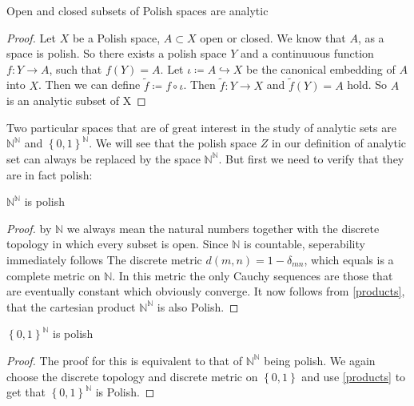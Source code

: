 \documentclass[10pt, a4paper, titlepage]{article}
\numberwithin{equation}{section}
\begin{document}
\begin{theorem}
	Open and closed subsets of Polish spaces are analytic
\end{theorem}

\begin{proof}
	Let $X$ be a Polish space, $A \subset X$ open or closed.
	We know that $A$, as a space is polish. So there exists a polish space $Y$ and a continuuous function  $f:Y\to A$, such that  $f(Y) = A$. 
	Let $\iota  \coloneq A \hookrightarrow X$ be the canonical embedding of  $A$ into  $X$. 
	Then we can define  $\tilde{f}  \coloneq f \circ \iota$. Then  $\tilde{f}:Y \to X $ and  $\tilde{f}(Y) = A$ hold. So  $A$ is an analytic subset of X


\end{proof}

Two particular spaces that are of great interest in the study of analytic sets are $\mathbb{N}^{\mathbb{N}}$ and $\left\{ 0,1 \right\}^{\mathbb{N}} $.
We will see that the polish space $Z$ in our definition of analytic set can always be replaced by the space $\mathbb{N}^{\mathbb{N}}$. But first we need to verify that they are in fact polish:

\begin{theorem}
	$\mathbb{N}^\mathbb{N}$ is polish
\end{theorem}
\begin{proof}
	by $\mathbb{N}$ we always mean the natural numbers together with the discrete topology in which every subset is open. Since $\mathbb{N}$ is countable, seperability immediately follows
	The discrete metric $d\left( m,n \right) = 1 - \delta_{mn} $, which equals is a complete metric on  $\mathbb{N}$.
	In this metric the only Cauchy sequences are those that are eventually constant which obviously converge.
	It now follows from \ref{products}, that the cartesian product $\mathbb{N}^{\mathbb{N}}$ is also Polish.
\end{proof}

\begin{theorem}
	$\left\{ 0,1 \right\}^\mathbb{N}$ is polish
\end{theorem}
\begin{proof}
	The proof for this is equivalent to that of $\mathbb{N}^{\mathbb{N}}$ being polish. We again choose the discrete topology and discrete metric on $\left\{ 0,1 \right\} $ and use \ref{products} to get that $\left\{ 0,1 \right\} ^{\mathbb{N}} $ is Polish.	
\end{proof}
\end{document}
